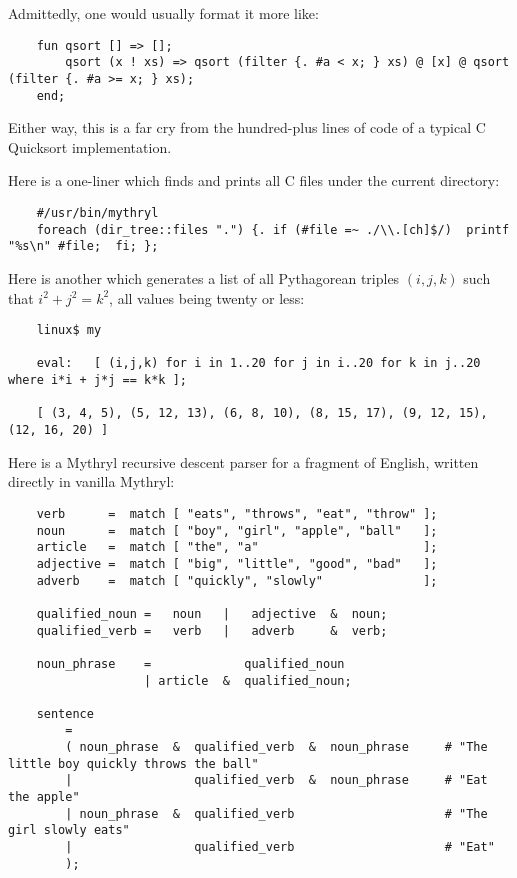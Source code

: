 Admittedly, one would usually format it more like:

\begin{verbatim}
    fun qsort [] => [];
        qsort (x ! xs) => qsort (filter {. #a < x; } xs) @ [x] @ qsort (filter {. #a >= x; } xs);
    end;
\end{verbatim}

Either way, this is a far cry from the hundred-plus lines of code of a typical C Quicksort implementation.

Here is a one-liner which finds and prints all C files under the current directory:

\begin{verbatim}
    #/usr/bin/mythryl
    foreach (dir_tree::files ".") {. if (#file =~ ./\\.[ch]$/)  printf "%s\n" #file;  fi; };
\end{verbatim}

Here is another which generates a list of all Pythagorean triples $(i,j,k)$ such that $i^2 + j^2 = k^2$, 
all values being twenty or less:

\begin{verbatim}
    linux$ my

    eval:   [ (i,j,k) for i in 1..20 for j in i..20 for k in j..20 where i*i + j*j == k*k ];

    [ (3, 4, 5), (5, 12, 13), (6, 8, 10), (8, 15, 17), (9, 12, 15), (12, 16, 20) ]
\end{verbatim}

Here is a Mythryl recursive descent parser for a fragment of English, written 
directly in vanilla Mythryl:

\begin{verbatim}
    verb      =  match [ "eats", "throws", "eat", "throw" ];
    noun      =  match [ "boy", "girl", "apple", "ball"   ];
    article   =  match [ "the", "a"                       ];
    adjective =  match [ "big", "little", "good", "bad"   ];
    adverb    =  match [ "quickly", "slowly"              ];

    qualified_noun =   noun   |   adjective  &  noun;
    qualified_verb =   verb   |   adverb     &  verb;

    noun_phrase    =             qualified_noun
                   | article  &  qualified_noun;

    sentence
        =
        ( noun_phrase  &  qualified_verb  &  noun_phrase     # "The little boy quickly throws the ball"
        |                 qualified_verb  &  noun_phrase     # "Eat the apple"
        | noun_phrase  &  qualified_verb                     # "The girl slowly eats"
        |                 qualified_verb                     # "Eat"
        );
\end{verbatim}


